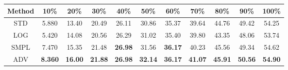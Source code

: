 \documentclass{standalone}
\begin{document}
\begin{tabular}{c|cccccccccc}
      \toprule
      Method & 10\% & 20\% & 30\% & 40\% & 50\% & 60\% & 70\% & 80\% & 90\% & 100\% \\
      \midrule
STD & 5.880 & 13.40 & 20.49 & 26.11 & 30.86 & 35.37 & 39.64 & 44.76 & 49.42 & 54.25\\
LOG & 5.420 & 14.08 & 20.56 & 26.29 & 31.02 & 35.40 & 39.80 & 43.35 & 48.06 & 53.74\\
SMPL & 7.470 & 15.35 & 21.48 & \textbf{26.98} & 31.56 & \textbf{36.17} & 40.23 & 45.56 & 49.34 & 54.62\\
ADV & \textbf{8.360} & \textbf{16.00} & \textbf{21.88} & \textbf{26.98} & \textbf{32.14} & \textbf{36.17} & \textbf{41.07} & \textbf{45.91} & \textbf{50.56} & \textbf{54.90}\\
  \bottomrule
\end{tabular}
\end{document}
